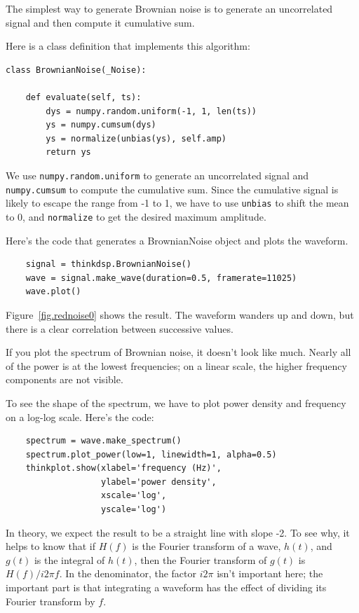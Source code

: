 \documentclass[12pt]{book}
\begin{document}
The simplest way to generate Brownian noise is to generate an
uncorrelated signal and then compute it cumulative sum.

Here is a class definition that implements this algorithm:

\begin{verbatim}
class BrownianNoise(_Noise):

    def evaluate(self, ts):
        dys = numpy.random.uniform(-1, 1, len(ts))
        ys = numpy.cumsum(dys)
        ys = normalize(unbias(ys), self.amp)
        return ys
\end{verbatim}

We use {\tt numpy.random.uniform} to generate an uncorrelated signal
and {\tt numpy.cumsum} to compute the cumulative sum.  Since the
cumulative signal is likely to escape the range from -1 to 1, we
have to use {\tt unbias} to shift the mean to 0, and
{\tt normalize} to get the desired maximum amplitude.

Here's the code that generates a BrownianNoise object and plots the
waveform.

\begin{verbatim}
    signal = thinkdsp.BrownianNoise()
    wave = signal.make_wave(duration=0.5, framerate=11025)
    wave.plot()
\end{verbatim}

Figure~\ref{fig.rednoise0} shows the result.  The waveform
wanders up and down, but there is a clear correlation between
successive values.

If you plot the spectrum of Brownian noise, it doesn't look like
much.  Nearly all of the power is at the lowest frequencies; on a
linear scale, the higher frequency components are not visible.

To see the shape of the spectrum, we have to plot power density
and frequency on a log-log scale.  Here's the code:

\begin{verbatim}
    spectrum = wave.make_spectrum()
    spectrum.plot_power(low=1, linewidth=1, alpha=0.5)
    thinkplot.show(xlabel='frequency (Hz)',
                   ylabel='power density',
                   xscale='log',
                   yscale='log')
\end{verbatim}

In theory, we expect the result to be a straight line with slope -2.
To see why, it helps to know that if $H(f)$ is the Fourier transform
of a wave, $h(t)$, and $g(t)$ is the integral of $h(t)$, then the
Fourier transform of $g(t)$ is $H(f) / i 2 \pi f$.  In the denominator,
the factor $i 2 \pi$ isn't important here; the important part is that
integrating a waveform has the effect of dividing its Fourier
transform by $f$.
\end{document}
